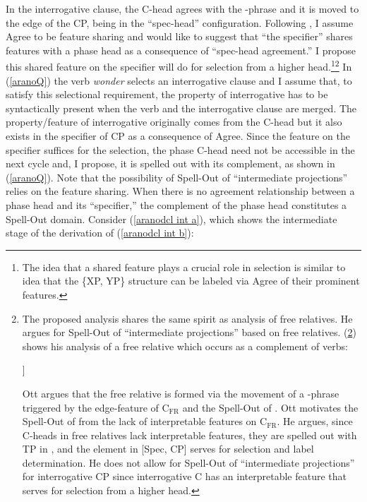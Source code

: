 \documentclass[output=paper]{langscibook}
\begin{document}
\noindent In the interrogative clause, the C-head agrees with the \wh-phrase and it is moved to the edge of the CP, being in the ``spec-head'' configuration. Following \citet{Frampton:2000}, I assume Agree to be feature sharing and would like to suggest that ``the specifier'' shares features with a phase head as a consequence of ``spec-head agreement.'' I propose this shared feature on the specifier will do for selection from a higher head.\footnote{The idea that a shared feature plays a crucial role in selection is similar to  idea that the \{XP, YP\} structure can be labeled via Agree of their prominent features.}\footnote{\label{aranofn Ott}The proposed analysis shares the same spirit as  analysis of free relatives. He argues for Spell-Out of ``intermediate projections'' based on free relatives. (\ref{aranoFR}) shows his analysis of a free relative which occurs as a complement of verbs:

\ea \label{aranoFR} {} \upshape
 [\sub{vP} eat [ what$_\mathrm{i}$ \shade{C$_{\mathrm{FR}}$ [\sub{TP} you T$_\mathrm{\upphi}$ cook t$_\mathrm{i}$]}]]
\z 

\noindent Ott argues that the free relative is formed via the movement of a \wh-phrase triggered by the edge-feature of C$_{\mathrm{FR}}$ and the Spell-Out of . Ott motivates the Spell-Out of  from the lack of interpretable features on C$_{\mathrm{FR}}$\@. He argues, since C-heads in free relatives lack interpretable features, they are spelled out with TP in , and the element in [Spec, CP] serves for selection and label determination. He does not allow for Spell-Out of ``intermediate projections'' for interrogative CP since interrogative C has an interpretable feature that serves for selection from a higher head.} In (\ref{aranoQ}) the verb \emph{wonder} selects an interrogative clause and I assume that, to satisfy this selectional requirement, the property of interrogative has to be syntactically present when the verb and the interrogative clause are merged. The property/feature of interrogative originally comes from the C-head but it also exists in the specifier of CP as a consequence of Agree\@. Since the feature on the specifier suffices for the selection, the phase C-head need not be accessible in the next cycle and, I propose, it is spelled out with its complement, as shown in (\ref{aranoQ}). Note that the possibility of Spell-Out of ``intermediate projections'' relies on the feature sharing. When there is no agreement relationship between a phase head and its ``specifier,'' the complement of the phase head constitutes a Spell-Out domain. Consider (\ref{aranodcl int a}), which shows the intermediate stage of the derivation of (\ref{aranodcl int b}):
\end{document}
